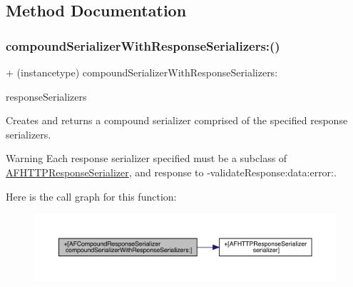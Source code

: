 \subsection{Method Documentation}
\mbox{\label{interface_a_f_compound_response_serializer_a48bf2d3d5a18d9cc73b6e29ef30c6e56}} 
\subsubsection{\texorpdfstring{compound\+Serializer\+With\+Response\+Serializers\+:()}{compoundSerializerWithResponseSerializers:()}\hspace{0.1cm}{\footnotesize\ttfamily [1/3]}}
{\footnotesize\ttfamily + (instancetype) compound\+Serializer\+With\+Response\+Serializers\+: \begin{DoxyParamCaption}\item[{(N\+S\+Array $\ast$)}]{response\+Serializers }\end{DoxyParamCaption}}

Creates and returns a compound serializer comprised of the specified response serializers.

\begin{DoxyWarning}{Warning}
Each response serializer specified must be a subclass of {\ttfamily \mbox{\hyperlink{interface_a_f_h_t_t_p_response_serializer}{A\+F\+H\+T\+T\+P\+Response\+Serializer}}}, and response to {\ttfamily -\/validate\+Response\+:data\+:error\+:}. 
\end{DoxyWarning}
Here is the call graph for this function\+:\nopagebreak
\begin{figure}[H]
\begin{center}
\leavevmode
\includegraphics[width=350pt]{interface_a_f_compound_response_serializer_a48bf2d3d5a18d9cc73b6e29ef30c6e56_cgraph}
\end{center}
\end{figure}
\mbox{\label{interface_a_f_compound_response_serializer_a48bf2d3d5a18d9cc73b6e29ef30c6e56}} 
